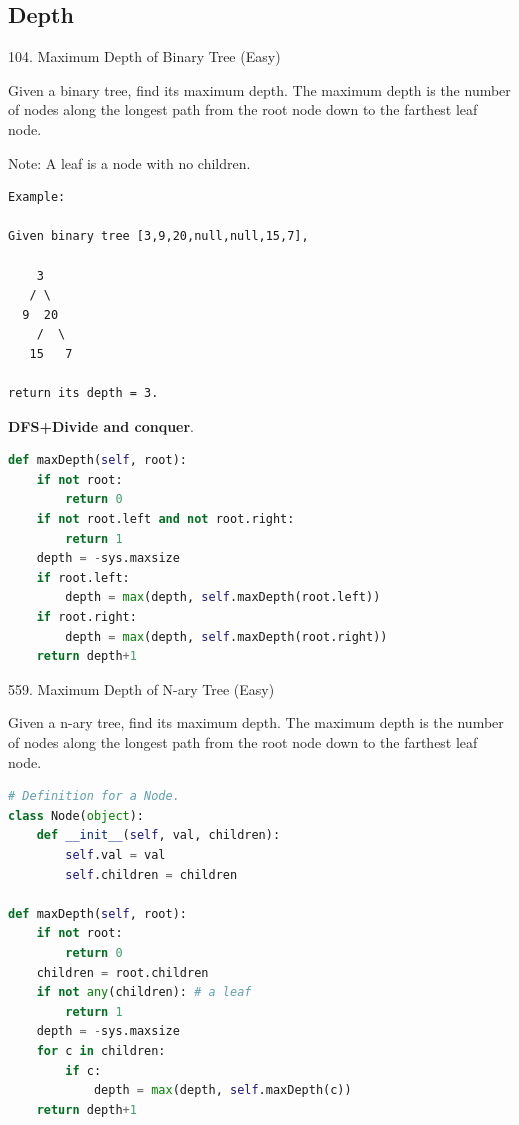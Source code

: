 \documentclass[../main.tex]{subfiles}
\begin{document}
\subsection{Depth}
104. Maximum Depth of Binary Tree (Easy)

Given a binary tree, find its maximum depth. The maximum depth is the number of nodes along the longest path from the root node down to the farthest leaf node.

Note: A leaf is a node with no children.
\begin{lstlisting}
Example:

Given binary tree [3,9,20,null,null,15,7],

    3
   / \
  9  20
    /  \
   15   7

return its depth = 3.
\end{lstlisting}
\textbf{DFS+Divide and conquer}.
\begin{lstlisting}[language=Python]
def maxDepth(self, root):
    if not root:
        return 0
    if not root.left and not root.right:
        return 1
    depth = -sys.maxsize
    if root.left:
        depth = max(depth, self.maxDepth(root.left))
    if root.right:
        depth = max(depth, self.maxDepth(root.right))
    return depth+1 
\end{lstlisting}
559. Maximum Depth of N-ary Tree (Easy)

Given a n-ary tree, find its maximum depth. The maximum depth is the number of nodes along the longest path from the root node down to the farthest leaf node.
\begin{lstlisting}[language=Python]
# Definition for a Node.
class Node(object):
    def __init__(self, val, children):
        self.val = val
        self.children = children

def maxDepth(self, root):
    if not root:
        return 0
    children = root.children
    if not any(children): # a leaf
        return 1
    depth = -sys.maxsize
    for c in children:
        if c:
            depth = max(depth, self.maxDepth(c))
    return depth+1
\end{lstlisting}
\end{document}
